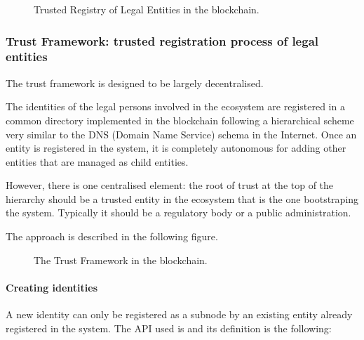 \documentclass[a4paper,12pt,english]{sphinxhowto}
\begin{document}
\begin{figure}[htbp]
\centering
\capstart

\noindent{}
\caption{Trusted Registry of Legal Entities in the blockchain.}\label{\detokenize{ssi/privacycred:id4}}\end{figure}


\subsubsection{Trust Framework: trusted registration process of legal entities}
\label{\detokenize{ssi/privacycred:trust-framework-trusted-registration-process-of-legal-entities}}
\sphinxAtStartPar
The trust framework is designed to be largely decentralised.

\sphinxAtStartPar
The identities of the legal persons involved in the ecosystem are registered in a common directory implemented in the blockchain following a hierarchical scheme very similar to the DNS (Domain Name Service) schema in the Internet. Once an entity is registered in the system, it is completely autonomous for adding other entities that are managed as child entities.

\sphinxAtStartPar
However, there is one centralised element: the root of trust at the top of the hierarchy should be a trusted entity in the ecosystem that is the one bootstraping the system. Typically it should be a regulatory body or a public administration.

\sphinxAtStartPar
The approach is described in the following figure.

\begin{figure}[htbp]
\centering
\capstart

\noindent{}
\caption{The Trust Framework in the blockchain.}\label{\detokenize{ssi/privacycred:id5}}\end{figure}


\paragraph{Creating identities}
\label{\detokenize{ssi/privacycred:creating-identities}}
\sphinxAtStartPar
A new identity can only be registered as a sub\sphinxhyphen{}node by an existing entity already registered in the system. The API used is  and its definition is the following:
\end{document}
